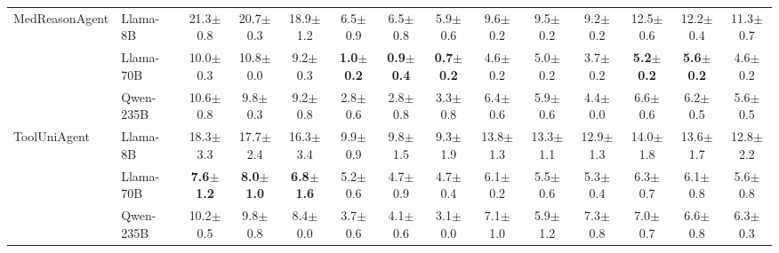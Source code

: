 \begin{table}[h]
{\begin{tabular}{ll ccc ccc ccc ccc}
\midrule
\multirow{3}{*}{MedReasonAgent} & Llama-8B & 21.3{\tiny$\pm$0.8} & 20.7{\tiny$\pm$0.3} & 18.9{\tiny$\pm$1.2} & \cellcolor{rowgreen}6.5{\tiny$\pm$0.9} & \cellcolor{rowgreen}6.5{\tiny$\pm$0.8} & \cellcolor{rowgreen}5.9{\tiny$\pm$0.6} & \cellcolor{rowgreen}9.6{\tiny$\pm$0.2} & \cellcolor{rowgreen}9.5{\tiny$\pm$0.2} & \cellcolor{rowgreen}9.2{\tiny$\pm$0.2} & \cellcolor{rowgreen}12.5{\tiny$\pm$0.6} & 12.2{\tiny$\pm$0.4} & 11.3{\tiny$\pm$0.7} \\
 & Llama-70B & 10.0{\tiny$\pm$0.3} & 10.8{\tiny$\pm$0.0} & 9.2{\tiny$\pm$0.3} & \textbf{\cellcolor{rowblue}1.0{\tiny$\pm$0.2}} & \textbf{\cellcolor{rowblue}0.9{\tiny$\pm$0.4}} & \textbf{\cellcolor{rowblue}0.7{\tiny$\pm$0.2}} & 4.6{\tiny$\pm$0.2} & 5.0{\tiny$\pm$0.2} & 3.7{\tiny$\pm$0.2} & \textbf{\cellcolor{rowblue}5.2{\tiny$\pm$0.2}} & \textbf{\cellcolor{rowblue}5.6{\tiny$\pm$0.2}} & 4.6{\tiny$\pm$0.2} \\
 & Qwen-235B & 10.6{\tiny$\pm$0.8} & \cellcolor{rowyellow}9.8{\tiny$\pm$0.3} & 9.2{\tiny$\pm$0.8} & 2.8{\tiny$\pm$0.6} & 2.8{\tiny$\pm$0.8} & 3.3{\tiny$\pm$0.8} & 6.4{\tiny$\pm$0.6} & \cellcolor{rowyellow}5.9{\tiny$\pm$0.6} & \cellcolor{rowyellow}4.4{\tiny$\pm$0.0} & \cellcolor{rowyellow}6.6{\tiny$\pm$0.6} & \cellcolor{rowyellow}6.2{\tiny$\pm$0.5} & \cellcolor{rowyellow}5.6{\tiny$\pm$0.5} \\

\midrule
\multirow{3}{*}{ToolUniAgent} & Llama-8B & 18.3{\tiny$\pm$3.3} & 17.7{\tiny$\pm$2.4} & 16.3{\tiny$\pm$3.4} & 9.9{\tiny$\pm$0.9} & 9.8{\tiny$\pm$1.5} & 9.3{\tiny$\pm$1.9} & 13.8{\tiny$\pm$1.3} & 13.3{\tiny$\pm$1.1} & 12.9{\tiny$\pm$1.3} & 14.0{\tiny$\pm$1.8} & 13.6{\tiny$\pm$1.7} & 12.8{\tiny$\pm$2.2} \\
 & Llama-70B & \textbf{\cellcolor{rowblue}7.6{\tiny$\pm$1.2}} & \textbf{\cellcolor{rowblue}8.0{\tiny$\pm$1.0}} & \textbf{\cellcolor{rowblue}6.8{\tiny$\pm$1.6}} & 5.2{\tiny$\pm$0.6} & 4.7{\tiny$\pm$0.9} & 4.7{\tiny$\pm$0.4} & 6.1{\tiny$\pm$0.2} & 5.5{\tiny$\pm$0.6} & 5.3{\tiny$\pm$0.4} & 6.3{\tiny$\pm$0.7} & 6.1{\tiny$\pm$0.8} & 5.6{\tiny$\pm$0.8} \\
 & Qwen-235B & \cellcolor{rowyellow}10.2{\tiny$\pm$0.5} & \cellcolor{rowyellow}9.8{\tiny$\pm$0.8} & \cellcolor{rowyellow}8.4{\tiny$\pm$0.0} & 3.7{\tiny$\pm$0.6} & 4.1{\tiny$\pm$0.6} & 3.1{\tiny$\pm$0.0} & 7.1{\tiny$\pm$1.0} & \cellcolor{rowyellow}5.9{\tiny$\pm$1.2} & 7.3{\tiny$\pm$0.8} & 7.0{\tiny$\pm$0.7} & 6.6{\tiny$\pm$0.8} & 6.3{\tiny$\pm$0.3} \\


\end{tabular}}
\end{table}
